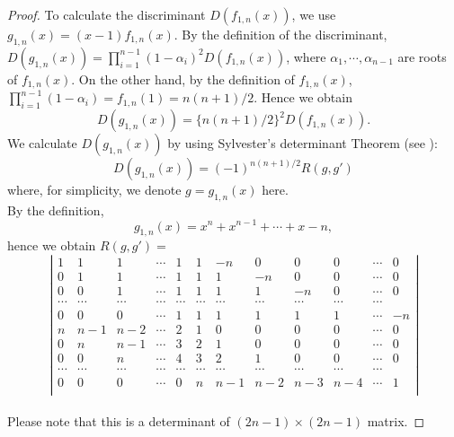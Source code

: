 \documentclass{article}
\begin{document}
\begin{proof}
To calculate the discriminant $D(f_{1,n}(x))$, we use $g_{1,n}(x)=(x-1)f_{1,n}(x)$. By the definition of the discriminant, $D(g_{1,n}(x))=\prod_{i=1}^{n-1}(1-\alpha_{i})^{2}D(f_{1,n}(x))$, where $\alpha_{1}, \cdots, \alpha_{n-1}$ are roots of $f_{1,n}(x)$. On the other hand, by the definition of $f_{1,n}(x)$, $\prod_{i=1}^{n-1}(1-\alpha_{i})=f_{1,n}(1)=n(n+1)/2$. Hence we obtain
\begin{equation}
D(g_{1,n}(x))=\{n(n+1)/2\}^{2}D(f_{1,n}(x)).
\end{equation}
We calculate $D(g_{1,n}(x))$ by using Sylvester's determinant Theorem (see \cite{LinearAlgebra}): 
\begin{equation}
D(g_{1,n}(x))=(-1)^{n(n+1)/2}R(g, g')
\end{equation}
where, for simplicity, we denote $g=g_{1,n}(x)$ here.
\\
By the definition, 
\begin{equation}
g_{1,n}(x)=x^{n}+x^{n-1}+\cdots +x-n,
\end{equation}
hence we obtain $R(g, g')=$
\begin{equation}
\left|
\begin{array}{cccccccccccc}
1 & 1 & 1 & \cdots & 1 & 1 & -n & 0 & 0 & 0 & \cdots & 0 \\
0 & 1 & 1 & \cdots & 1 & 1 & 1 & -n & 0 & 0 & \cdots & 0 \\
0 & 0 & 1 & \cdots & 1 & 1 & 1 & 1 & -n & 0 & \cdots & 0 \\
\cdots & \cdots & \cdots & \cdots & \cdots & \cdots & \cdots & \cdots & \cdots & \cdots & \cdots \\
0 & 0 & 0 & \cdots & 1 & 1 & 1 & 1 & 1 & 1 & \cdots & -n \\
n & n-1 & n-2 & \cdots & 2 & 1 & 0 & 0 & 0 & 0 & \cdots & 0 \\
0 & n & n-1 & \cdots & 3 & 2 & 1 & 0 & 0 & 0 & \cdots & 0 \\
0 & 0 & n & \cdots & 4 & 3 & 2 & 1 & 0 & 0 & \cdots & 0 \\
\cdots & \cdots & \cdots & \cdots & \cdots & \cdots & \cdots & \cdots & \cdots & \cdots & \cdots \\
0 & 0 & 0 & \cdots & 0 & n & n-1 & n-2 & n-3 & n-4 & \cdots & 1 \\
\end{array}
\right|
\end{equation}
\\
Please note that this is a determinant of $(2n-1) \times (2n-1)$ matrix.

\end{proof}
\end{document}
